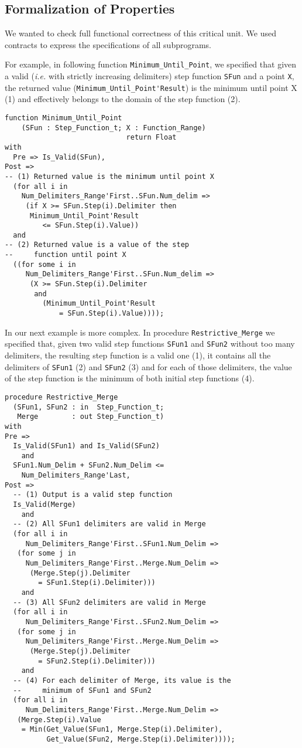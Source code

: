 \documentclass[10pt,a4paper,twocolumn]{article}
\newcommand{\ie}{\textit{i.e.}\xspace}
\newcommand{\SPARK}[1]{\lstinline[language=Ada,basicstyle={\footnotesize
      \sffamily},framesep=0pt]$#1$}
\begin{document}
\subsection{Formalization of Properties}

We wanted to check full functional correctness of this critical unit. We used
contracts to express the specifications of all subprograms.

For example, in following function \SPARK{Minimum_Until_Point}, we
specified that given a valid (\ie with strictly increasing delimiters)
step function \SPARK{SFun} and a point \SPARK{X}, the returned value
(\SPARK{Minimum_Until_Point'Result}) is the minimum until point X (1)
and effectively belongs to the domain of the step function (2).

\begin{lstlisting}
function Minimum_Until_Point
    (SFun : Step_Function_t; X : Function_Range)
                             return Float
with
  Pre => Is_Valid(SFun),
Post =>
-- (1) Returned value is the minimum until point X
  (for all i in
    Num_Delimiters_Range'First..SFun.Num_delim =>
     (if X >= SFun.Step(i).Delimiter then
      Minimum_Until_Point'Result
         <= SFun.Step(i).Value))
  and
-- (2) Returned value is a value of the step
--     function until point X
  ((for some i in
     Num_Delimiters_Range'First..SFun.Num_delim =>
      (X >= SFun.Step(i).Delimiter
       and
         (Minimum_Until_Point'Result
             = SFun.Step(i).Value))));
\end{lstlisting}

In our next example is more complex.
In procedure \SPARK{Restrictive_Merge} we specified that, given two
valid step functions \SPARK{SFun1} and
\SPARK{SFun2} without too many delimiters, the resulting step function is a
valid one (1), it contains all the delimiters of \SPARK{SFun1} (2) and
\SPARK{SFun2} (3) and for each of those delimiters, the value of the step
function is the minimum of both initial step functions (4).

\begin{lstlisting}
procedure Restrictive_Merge
  (SFun1, SFun2 : in  Step_Function_t;
   Merge        : out Step_Function_t)
with
Pre =>
  Is_Valid(SFun1) and Is_Valid(SFun2)
    and
  SFun1.Num_Delim + SFun2.Num_Delim <=
    Num_Delimiters_Range'Last,
Post =>
  -- (1) Output is a valid step function
  Is_Valid(Merge)
    and
  -- (2) All SFun1 delimiters are valid in Merge
  (for all i in
     Num_Delimiters_Range'First..SFun1.Num_Delim =>
   (for some j in
     Num_Delimiters_Range'First..Merge.Num_Delim =>
      (Merge.Step(j).Delimiter
        = SFun1.Step(i).Delimiter)))
    and
  -- (3) All SFun2 delimiters are valid in Merge
  (for all i in
     Num_Delimiters_Range'First..SFun2.Num_Delim =>
   (for some j in
     Num_Delimiters_Range'First..Merge.Num_Delim =>
      (Merge.Step(j).Delimiter
        = SFun2.Step(i).Delimiter)))
    and
  -- (4) For each delimiter of Merge, its value is the
  --     minimum of SFun1 and SFun2
  (for all i in
     Num_Delimiters_Range'First..Merge.Num_Delim =>
   (Merge.Step(i).Value
    = Min(Get_Value(SFun1, Merge.Step(i).Delimiter),
          Get_Value(SFun2, Merge.Step(i).Delimiter))));
\end{lstlisting}
\end{document}
